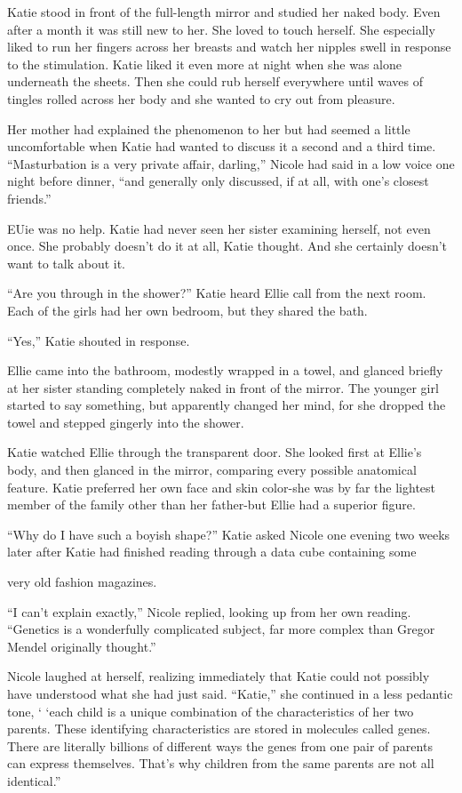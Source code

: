 \documentclass[]{article}
\begin{document}
{Katie stood in front of the full-length mirror and studied her naked body.  Even after a month it was still new to her.  She loved to touch herself.  She especially liked to run her fingers across her breasts and watch her nipples swell in response to the stimulation.  Katie liked it even more at night when she was alone underneath the sheets.  Then she could rub herself everywhere until waves of tingles rolled across her body and she wanted to cry out from pleasure.

Her mother had explained the phenomenon to her but had seemed a little uncomfortable when Katie had wanted to discuss it a second and a third time.  “Masturbation is a very private affair, darling,” Nicole had said in a low voice one night before dinner, “and generally only discussed, if at all, with one’s closest friends.”

EUie was no help.  Katie had never seen her sister examining herself, not even once.  She probably doesn’t do it at all, Katie thought.  And she certainly doesn’t want to talk about it.

“Are you through in the shower?” Katie heard Ellie call from the next room.  Each of the girls had her own bedroom, but they shared the bath.

“Yes,” Katie shouted in response.

Ellie came into the bathroom, modestly wrapped in a towel, and glanced briefly at her sister standing completely naked in front of the mirror.  The younger girl started to say something, but apparently changed her mind, for she dropped the towel and stepped gingerly into the shower.

Katie watched Ellie through the transparent door.  She looked first at Ellie’s body, and then glanced in the mirror, comparing every possible anatomical feature.  Katie preferred her own face and skin color-she was by far the lightest member of the family other than her father-but Ellie had a superior figure.

“Why do I have such a boyish shape?” Katie asked Nicole one evening two weeks later after Katie had finished reading through a data cube containing some

very old fashion magazines.

“I can’t explain exactly,” Nicole replied, looking up from her own reading.  “Genetics is a wonderfully complicated subject, far more complex than Gregor Mendel originally thought.”

Nicole laughed at herself, realizing immediately that Katie could not possibly have understood what she had just said.  “Katie,” she continued in a less pedantic tone, ‘ ‘each child is a unique combination of the characteristics of her two parents.  These identifying characteristics are stored in molecules called genes.  There are literally billions of different ways the genes from one pair of parents can express themselves.  That’s why children from the same parents are not all identical.”

}
\end{document}
